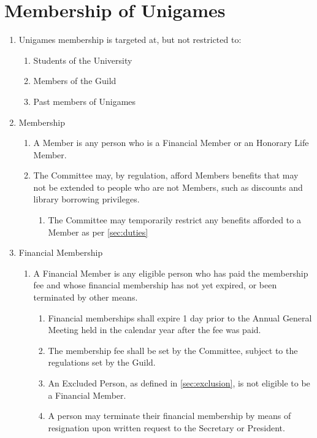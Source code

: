 \documentclass[a4paper]{article}
\begin{document}
\section{Membership of Unigames} \label{sec:membership}
\begin{enumerate}
    \item Unigames membership is targeted at, but not restricted to:
          \begin{enumerate}
              \item Students of the University
              \item Members of the Guild
              \item Past members of Unigames
          \end{enumerate}
    \item Membership
        \begin{enumerate}
            \item A Member is any person who is a Financial Member or an Honorary Life Member.
            \item The Committee may, by regulation, afford Members benefits that may not be extended to people who are not Members, such as discounts and library borrowing privileges.
            \begin{enumerate}
                \item The Committee may temporarily restrict any benefits afforded to a Member as per \cref{sec:duties}
            \end{enumerate}
        \end{enumerate}
    \item Financial Membership
        \begin{enumerate}
            \item A Financial Member is any eligible person who has paid the membership fee and whose financial membership has not yet expired, or been terminated by other means.
                \begin{enumerate}
                    \item Financial memberships shall expire 1 day prior to the Annual General Meeting held in the calendar year after the fee was paid.
                    \item The membership fee shall be set by the Committee, subject to the regulations set by the Guild.
                    \item An Excluded Person, as defined in \cref{sec:exclusion}, is not eligible to be a Financial Member.
                    \item A person may terminate their financial membership by means of resignation upon written request to the Secretary or President.

\end{enumerate}
\end{enumerate}
\end{enumerate}
\end{document}

